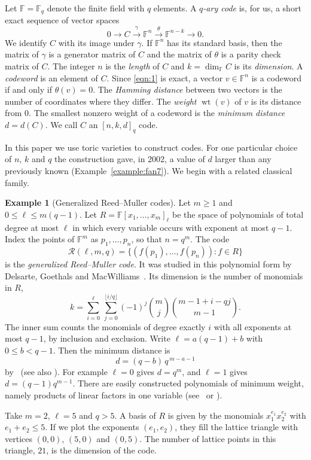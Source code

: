 \documentclass[12pt,letterpaper]{article}
\numberwithin{equation}{section}
\theoremstyle{definition}
\newtheorem{example}[theorem]{Example}
\theoremstyle{remark}
\DeclareMathOperator{\wt}{wt}
\newcommand{\F}{\mathbb{F}}
\newcommand{\Fq}{\mathbb{F}_q}
\newcommand{\RM}{\mathcal{R}}
\begin{document}
Let $\F=\Fq$ denote the finite field with $q$ elements. A \emph{$q$-ary code}
is, for us, a short exact sequence of vector spaces
\begin{equation}\label{eqn:1}
0 \longrightarrow C \xrightarrow{\ \gamma\ } \F^n
\xrightarrow{\ \theta\ } \F^{n-k} \longrightarrow 0 .
\end{equation}
We identify $C$ with its image under $\gamma$. If $\F^n$ has its standard
basis, then the matrix of $\gamma$ is a generator matrix of $C$ and the matrix
of $\theta$ is a parity check matrix of $C$. The integer $n$ is the
\emph{length} of $C$ and $k=\dim_{\F}C$ is its \emph{dimension}. A
\emph{codeword} is an element of $C$. Since \eqref{eqn:1} is exact, a vector
$v\in\F^n$ is a codeword if and only if $\theta(v)=0$. The \emph{Hamming
distance} between two vectors is the number of coordinates where they differ.
The \emph{weight} $\wt(v)$ of $v$ is its distance from $0$. The smallest
nonzero weight of a codeword is the \emph{minimum distance} $d=d(C)$. We call
$C$ an $[n,k,d]_q$ code.

In this paper we use toric varieties to construct codes. For one particular
choice of $n$, $k$ and $q$ the construction gave, in 2002, a value of $d$
larger than any previously known (Example~\ref{example:fan7}). We begin with a
related classical family.

\begin{example}[Generalized Reed--Muller codes]\label{example:RM}
Let $m\ge1$ and $0\le\ell\le m(q-1)$. Let $R=\F[x_1,\dots,x_m]_{\ell}$ be the
space of polynomials of total degree at most $\ell$ in which every variable
occurs with exponent at most $q-1$. Index the points of $\F^m$ as
$p_1,\dots,p_n$, so that $n=q^m$. The code
\[
\RM(\ell,m,q)=\{(f(p_1),\dots,f(p_n)) : f\in R\}
\]
is the \emph{generalized Reed--Muller code}. It was studied in this polynomial
form by Delsarte, Goethals and MacWilliams~\cite{DGM70}. Its dimension is the
number of monomials in $R$,
\[
k=\sum_{i=0}^{\ell}\ \sum_{j=0}^{\lfloor i/q\rfloor}(-1)^j\binom{m}{j}
\binom{m-1+i-qj}{m-1}.
\]
The inner sum counts the monomials of degree exactly $i$ with all exponents at
most $q-1$, by inclusion and exclusion. Write $\ell=a(q-1)+b$ with
$0\le b<q-1$. Then the minimum distance is
\[
d=(q-b)\,q^{\,m-a-1}
\]
by~\cite{DGM70} (see also \cite[Ch.~13, \S3]{MS77}). For example $\ell=0$
gives $d=q^m$, and $\ell=1$ gives $d=(q-1)q^{m-1}$. There are easily
constructed polynomials of minimum weight, namely products of linear factors
in one variable (see~\cite{DGM70} or \cite[p.~920]{PH98}).

Take $m=2$, $\ell=5$ and $q>5$. A basis of $R$ is given by the monomials
$x_1^{e_1}x_2^{e_2}$ with $e_1+e_2\le5$. If we plot the exponents
$(e_1,e_2)$, they fill the lattice triangle with vertices $(0,0)$, $(5,0)$ and
$(0,5)$. The number of lattice points in this triangle, $21$, is the dimension
of the code.
\end{example}
\end{document}
